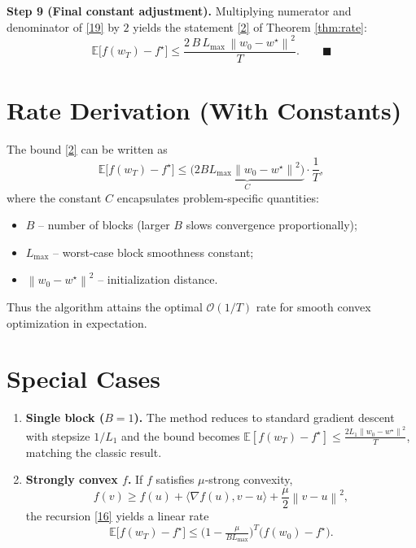 \documentclass{article}
\newcommand{\E}{\mathbb{E}}
\newcommand{\norm}[1]{\left\lVert #1\right\rVert}
\newcommand{\ip}[2]{\langle #1 , #2\rangle}
\begin{document}
\noindent\textbf{Step 9 (Final constant adjustment).}  
Multiplying numerator and denominator of \eqref{19} by $2$ yields the statement
\eqref{2} of Theorem \ref{thm:rate}:
\[
\E\!\bigl[f(w_{T})-f^{\star}\bigr]
\le \frac{2\,B\,L_{\max}\,\norm{w_{0}-w^{\star}}^{2}}{T}.
\qquad\blacksquare
\]

\section*{Rate Derivation (With Constants)}
The bound \eqref{2} can be written as
\[
\E\!\bigl[f(w_{T})-f^{\star}\bigr]
\le \underbrace{\bigl(2B L_{\max}\norm{w_{0}-w^{\star}}^{2}\bigr)}_{\displaystyle C}
\cdot\frac{1}{T},
\]
where the constant $C$ encapsulates problem‑specific quantities:
\begin{itemize}
\item $B$ – number of blocks (larger $B$ slows convergence proportionally);
\item $L_{\max}$ – worst‑case block smoothness constant;
\item $\norm{w_{0}-w^{\star}}^{2}$ – initialization distance.
\end{itemize}
Thus the algorithm attains the optimal $\mathcal{O}(1/T)$ rate for smooth convex
optimization in expectation.

\section*{Special Cases}
\begin{enumerate}
\item \textbf{Single block ($B=1$).} The method reduces to standard gradient descent with stepsize $1/L_{1}$ and the bound becomes $\displaystyle \E[f(w_{T})-f^{\star}]\le \frac{2L_{1}\norm{w_{0}-w^{\star}}^{2}}{T}$, matching the classic result.
\item \textbf{Strongly convex $f$.} If $f$ satisfies $\mu$‑strong convexity,
\[
f(v)\ge f(u)+\ip{\nabla f(u)}{v-u}+\frac{\mu}{2}\norm{v-u}^{2},
\]
the recursion \eqref{16} yields a linear rate
\[
\E\!\bigl[f(w_{T})-f^{\star}\bigr]
\le \bigl(1-\tfrac{\mu}{B L_{\max}}\bigr)^{T}\!\bigl(f(w_{0})-f^{\star}\bigr).
\]
\end{enumerate}
\end{document}
